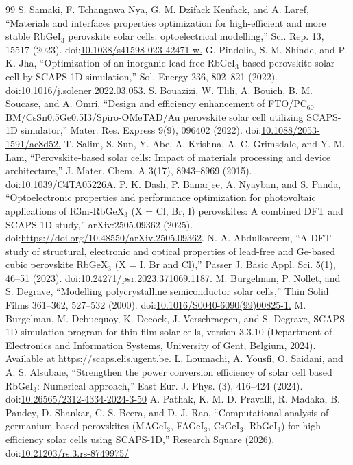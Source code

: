 \documentclass[aip,jap,amsmath,amssymb,preprint]{revtex4-2}
\begin{document}
\begin{thebibliography}{99}
 S. Samaki, F. Tchangnwa Nya, G. M. Dzifack Kenfack, and A. Laref, ``Materials and interfaces properties optimization for high-efficient and more stable RbGeI$_{3}$ perovskite solar cells: optoelectrical modelling,'' Sci. Rep. 13, 15517 (2023). doi:\url{10.1038/s41598-023-42471-w.}
 G. Pindolia, S. M. Shinde, and P. K. Jha, ``Optimization of an inorganic lead-free RbGeI$_{3}$ based perovskite solar cell by SCAPS-1D simulation,'' Sol. Energy 236, 802--821 (2022). doi:\url{10.1016/j.solener.2022.03.053.}
 S. Bouazizi, W. Tlili, A. Bouich, B. M. Soucase, and A. Omri, ``Design and efficiency enhancement of FTO/\allowbreak{}PC$_{60}$BM/CsSn0.5Ge0.5I3/\allowbreak{}Spiro-OMeTAD/\allowbreak{}Au perovskite solar cell utilizing SCAPS-1D simulator,'' Mater. Res. Express 9(9), 096402 (2022). doi:\url{10.1088/2053-1591/ac8d52.}
 T. Salim, S. Sun, Y. Abe, A. Krishna, A. C. Grimsdale, and Y. M. Lam, ``Perovskite-based solar cells: Impact of materials processing and device architecture,'' J. Mater. Chem. A 3(17), 8943--8969 (2015). doi:\url{10.1039/C4TA05226A.}
 P. K. Dash, P. Banarjee, A. Nyayban, and S. Panda, ``Optoelectronic properties and performance optimization for photovoltaic applications of R3m-RbGeX$_{3}$ (X = Cl, Br, I) perovskites: A combined DFT and SCAPS-1D study,'' arXiv:2505.09362 (2025). doi:\url{https://doi.org/10.48550/arXiv.2505.09362}.
 N. A. Abdulkareem, ``A DFT study of structural, electronic and optical properties of lead-free and Ge-based cubic perovskite RbGeX$_{3}$ (X = I, Br and Cl),'' Passer J. Basic Appl. Sci. 5(1), 46--51 (2023). doi:\url{10.24271/psr.2023.371069.1187.}
 M. Burgelman, P. Nollet, and S. Degrave, ``Modelling polycrystalline semiconductor solar cells,'' Thin Solid Films 361--362, 527--532 (2000). doi:\url{10.1016/S0040-6090(99)00825-1.}
 M. Burgelman, M. Debucquoy, K. Decock, J. Verschraegen, and S. Degrave, SCAPS-1D simulation program for thin film solar cells, version 3.3.10 (Department of Electronics and Information Systems, University of Gent, Belgium, 2024). Available at \url{https://scaps.elis.ugent.be}.
 L. Loumachi, A. Yousfi, O. Saidani, and A. S. Alsubaie, ``Strengthen the power conversion efficiency of solar cell based RbGeI$_{3}$: Numerical approach,'' East Eur. J. Phys. (3), 416--424 (2024). doi:\url{10.26565/2312-4334-2024-3-50}
 A. Pathak, K. M. D. Pravalli, R. Madaka, B. Pandey, D. Shankar, C. S. Beera, and D. J. Rao, ``Computational analysis of germanium-based perovskites (MAGeI$_{3}$, FAGeI$_{3}$, CsGeI$_{3}$, RbGeI$_{3}$) for high-efficiency solar cells using SCAPS-1D,'' Research Square (2026). doi:\url{10.21203/rs.3.rs-8749975/}

\end{thebibliography}
\end{document}
